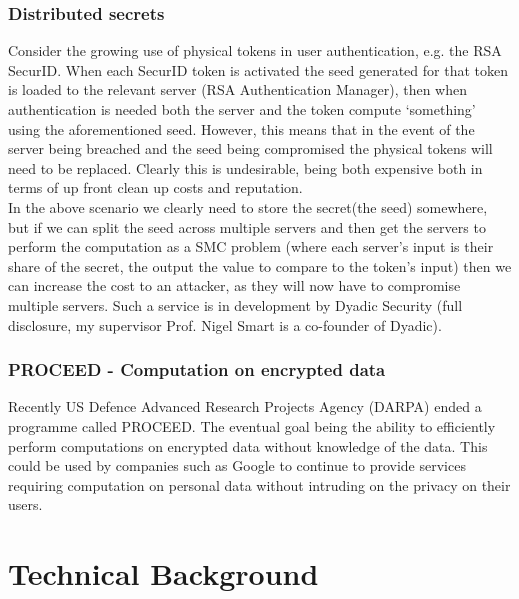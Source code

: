 \documentclass[ %
                    author={Nicholas Tutte},
                supervisor={Prof. Nigel Smart},
                    degree={MEng},
                     title={Secure Two Party Computation},
                  subtitle={A practical comparison of recent protocols},
                      type={Research - GG1K},
                      year={2015} ]{dissertation}
\begin{document}
			\subsection{Distributed secrets} \label{sub2:DistributedSecretApplication}
				Consider the growing use of physical tokens in user authentication, e.g. the RSA SecurID. When each SecurID token is activated the seed generated for that token is loaded to the relevant server (RSA Authentication Manager), then when authentication is needed both the server and the token compute `something' using the aforementioned seed. However, this means that in the event of the server being breached and the seed being compromised the physical tokens will need to be replaced. Clearly this is undesirable, being both expensive both in terms of up front clean up costs and reputation.\\

				In the above scenario we clearly need to store the secret(the seed) somewhere, but if we can split the seed across multiple servers and then get the servers to perform the computation as a SMC problem (where each server's input is their share of the secret, the output the value to compare to the token's input) then we can increase the cost to an attacker, as they will now have to compromise multiple servers. Such a service is in development by Dyadic Security (full disclosure, my supervisor Prof. Nigel Smart is a co-founder of Dyadic).

			\subsection{PROCEED - Computation on encrypted data} \label{sub2:PROCEED_DARPA}
				Recently US Defence Advanced Research Projects Agency (DARPA) ended a programme called PROCEED. The eventual goal being the ability to efficiently perform computations on encrypted data without knowledge of the data. This could be used by companies such as Google to continue to provide services requiring computation on personal data without intruding on the privacy on their users.


	
	\chapter{Technical Background}
\end{document}
